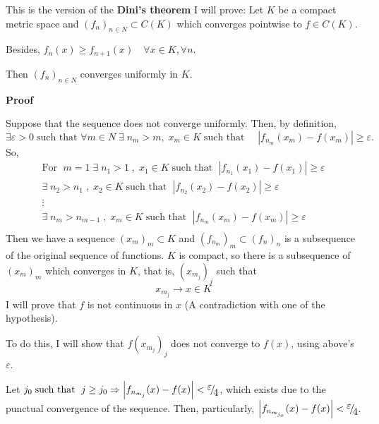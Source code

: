 \documentclass[12pt]{article}
\begin{document}
This is the version of the \textbf{Dini's theorem} I will prove:
Let $K$ be a compact metric space and $\left( {f_n }
\right)_{n\in N} \subset C(K)$ which converges pointwise to $f\in
C(K)$.

Besides, $f_n (x)\ge f_{n+1} (x)\quad \forall x\in K,\forall n$.

Then $\left( {f_n } \right)_{n\in N} $ converges uniformly in $K$.

\textbf{Proof}

Suppose that the sequence does not converge uniformly. Then, by definition,
\[
\exists \varepsilon >0\;\text{such that }\forall m\in N\;\exists \;n_m
>m,\;x_m \in K\;\text{such that }\quad \left| {f_{n_m } (x_m )-f(x_m )}
\right|\ge \varepsilon .
\]
So,
\[
\begin{array}{l}
 \text{For } \;m=1\;\exists \;n_1 >1\;,\;x_1 \in K\;\text{such that }\;\left| {f_{n_1 } (x_1
)-f(x_1 )} \right|\ge \varepsilon \\
 \exists \;n_2 >n_1 \;,\;x_2 \in K\;\text{such that }\;\left| {f_{n_2 } (x_2
)-f(x_2 )} \right|\ge \varepsilon \\
 \vdots \\
 \exists \;n_m >n_{m-1} \;,\;x_m \in K\;\text{such that }\;\left| {f_{n_m } (x_m
)-f(x_m )} \right|\ge \varepsilon \\
 \end{array}
\]
Then we have a sequence $\left( {x_m } \right)_m \subset K$ and $\left( {f_{n_{m}} } \right)_m \subset \left( {f_n } \right)_n$
is a subsequence of the original sequence of functions. $K$ is compact, so there is a subsequence of $\left( {x_m } \right)_m$
which converges in $K$, that is, $\left( {x_{m_{j}} } \right)_j $ such that
\[
x_{m_{j}}\longrightarrow x \in K
\]
I will prove that $f$ is not continuous in $x$ (A contradiction with one of the hypothesis).

To do this, I will show that $f\left( {x_{m_{j}} } \right)_j $ does not converge to $f(x)$, using above's $\varepsilon$.


Let $j_0 \;\text{such that }\;j\ge j_0 \Rightarrow \left| {f_{n_{m_j } } (x)-f(x)}
\right|<\raise0.7ex\hbox{$\varepsilon $} \!\mathord{\left/ {\vphantom
{\varepsilon 4}}\right.\kern-\nulldelimiterspace}\!\lower0.7ex\hbox{$4$}$,
which exists due to the punctual convergence of the sequence. Then,
particularly, $\left| {f_{n_{m_{j_o } } } (x)-f(x)}
\right|<\raise0.7ex\hbox{$\varepsilon $} \!\mathord{\left/ {\vphantom
{\varepsilon 4}}\right.\kern-\nulldelimiterspace}\!\lower0.7ex\hbox{$4$}$.
\end{document}
